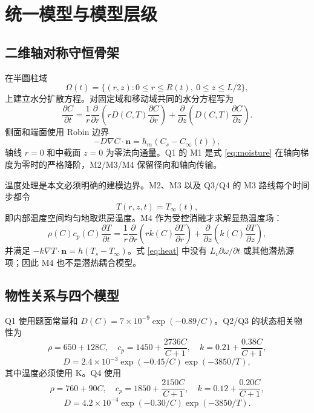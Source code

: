 \documentclass[withoutpreface,bwprint]{cumcmthesis}
\begin{document}
\section{统一模型与模型层级}

\subsection{二维轴对称守恒骨架}

在半圆柱域
\[
\Omega(t)=\{(r,z):0\le r\le R(t),\ 0\le z\le L/2\},
\]
上建立水分扩散方程。对固定域和移动域共同的水分方程写为
\begin{equation}
\frac{\partial C}{\partial t}=\frac1r\frac{\partial}{\partial r}\left(rD(C,T)\frac{\partial C}{\partial r}\right)+\frac{\partial}{\partial z}\left(D(C,T)\frac{\partial C}{\partial z}\right).
\label{eq:moisture}
\end{equation}
侧面和端面使用 Robin 边界
\begin{equation}
-D\nabla C\cdot\boldsymbol n=h_m(C_s-C_\infty(t)),
\label{eq:mass-robin}
\end{equation}
轴线 \(r=0\) 和中截面 \(z=0\) 为零法向通量。Q1 的 M1 是式 \eqref{eq:moisture} 在轴向梯度为零时的严格降阶，M2/M3/M4 保留径向和轴向传输。

温度处理是本文必须明确的建模边界。M2、M3 以及 Q3/Q4 的 M3 路线每个时间步都令
\begin{equation}
T(r,z,t)=T_\infty(t),
\label{eq:prescribed-temperature}
\end{equation}
即内部温度空间均匀地取烘房温度。M4 作为受控消融才求解显热温度场：
\begin{equation}
\rho(C)c_p(C)\frac{\partial T}{\partial t}=\frac1r\frac{\partial}{\partial r}\left(rk(C)\frac{\partial T}{\partial r}\right)+\frac{\partial}{\partial z}\left(k(C)\frac{\partial T}{\partial z}\right),
\label{eq:heat}
\end{equation}
并满足 \(-k\nabla T\cdot\boldsymbol n=h(T_s-T_\infty)\)。式 \eqref{eq:heat} 中没有 \(L_v\partial\omega/\partial t\) 或其他潜热源项；因此 M4 也不是潜热耦合模型。

\subsection{物性关系与四个模型}

Q1 使用题面常量和 \(D(C)=7\times10^{-9}\exp(-0.89/C)\)。Q2/Q3 的状态相关物性为
\begin{equation}
\rho=650+128C,\quad c_p=1450+\frac{2736C}{C+1},\quad k=0.21+\frac{0.38C}{C+1},
\end{equation}
\begin{equation}
D=2.4\times10^{-3}\exp(-0.45/C)\exp(-3850/T),
\label{eq:props-q23}
\end{equation}
其中温度必须使用 K。Q4 使用
\begin{equation}
\rho=760+90C,\quad c_p=1850+\frac{2150C}{C+1},\quad k=0.12+\frac{0.20C}{C+1},
\end{equation}
\begin{equation}
D=4.2\times10^{-4}\exp(-0.30/C)\exp(-3850/T).
\label{eq:props-q4}
\end{equation}
\end{document}
